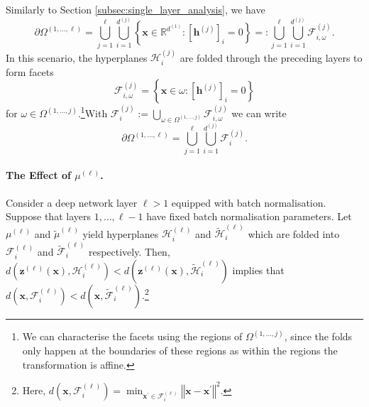 Similarly to Section \ref{subsec:single_layer_analysis}, we have $$\partial\Omega^{(1,\dots,\ell)}=\bigcup_{j=1}^{\ell}\bigcup_{i=1}^{d^{(j)}}\left\{\mathbf{x}\in\mathbb{R}^{d^{(1)}}:\left[\mathbf{h}^{(j)}\right]_i=0\right\}=:\bigcup_{j=1}^{\ell}\bigcup_{i=1}^{d^{(j)}}\mathcal{F}^{(j)}_{i,\omega}.$$In this scenario, the hyperplanes $\mathcal{H}^{(j)}_i$ are folded through the preceding layers to form facets $$\mathcal{F}^{(j)}_{i,\omega}=\left\{\mathbf{x}\in\omega:\left[\mathbf{h}^{(j)}\right]_i=0\right\}$$for $\omega\in\Omega^{(1,\dots,j)}$.\footnote{We can characterise the facets using the regions of $\Omega^{(1,\dots,j)}$, since the folds only happen at the boundaries of these regions as within the regions the transformation is affine.}With $\mathcal{F}^{(j)}_{i}:=\bigcup_{\omega\in\Omega^{(1,\dots,j)}}\mathcal{F}^{(j)}_{i,\omega}$ we can write $$\partial\Omega^{(1,\dots,\ell)}=\bigcup_{j=1}^{\ell}\bigcup_{i=1}^{d^{(j)}}\mathcal{F}^{(j)}_{i}.$$

\paragraph{The Effect of $\mu^{(\ell)}$.}

\begin{theorem}\label{thm:effect_mean_bn_multilayer}
    Consider a deep network layer $\ell>1$ equipped with batch normalisation. Suppose that layers $1,\dots,\ell-1$ have fixed batch normalisation parameters. Let $\mu^{(\ell)}$ and $\tilde{\mu}^{(\ell)}$ yield hyperplanes $\mathcal{H}^{(\ell)}_i$ and $\tilde{\mathcal{H}}^{(\ell)}_i$ which are folded into $\mathcal{F}^{(\ell)}_i$ and $\tilde{\mathcal{F}}^{(\ell)}_i$ respectively. Then, $d\left(\mathbf{z}^{(\ell)}(\mathbf{x}),\mathcal{H}^{(\ell)}_i\right)<d\left(\mathbf{z}^{(\ell)}(\mathbf{x}),\tilde{\mathcal{H}}^{(\ell)}_i\right)$ implies that $d\left(\mathbf{x},\mathcal{F}^{(\ell)}_i\right)<d\left(\mathbf{x},\tilde{\mathcal{F}}^{(\ell)}_i\right)$.\footnote{Here, $d\left(\mathbf{x},\mathcal{F}^{(\ell)}_{i}\right)=\min_{\mathbf{x}^\prime\in\mathcal{F}^{(\ell)}_{i}}\left\Vert\mathbf{x}-\mathbf{x}^\prime\right\Vert^2$.}
\end{theorem}

